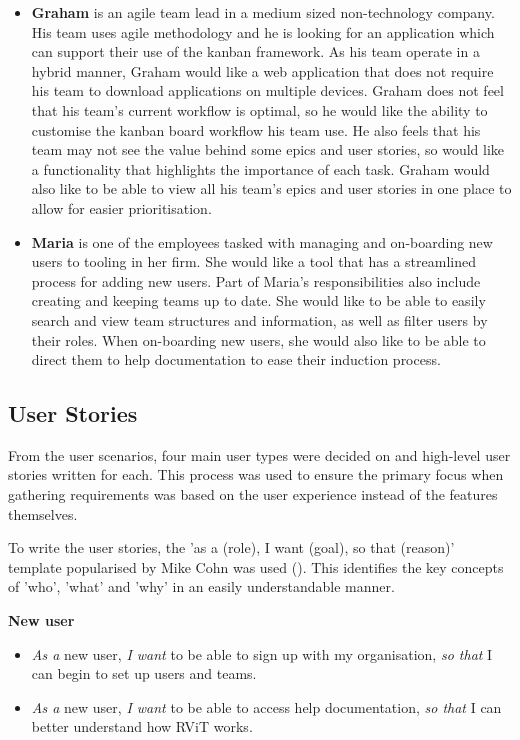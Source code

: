 \documentclass[l4proj.tex]{subfiles}
\begin{document}
\begin{itemize}
    \item \textbf{Graham} is an agile team lead in a medium sized non-technology company. His team uses agile methodology and he is looking for an application which can support their use of the kanban framework. As his team operate in a hybrid manner, Graham would like a web application that does not require his team to download applications on multiple devices. Graham does not feel that his team's current workflow is optimal, so he would like the ability to customise the kanban board workflow his team use. He also feels that his team may not see the value behind some epics and user stories, so would like a functionality that highlights the importance of each task. Graham would also like to be able to view all his team's epics and user stories in one place to allow for easier prioritisation. \\

    \item \textbf{Maria} is one of the employees tasked with managing and on-boarding new users to tooling in her firm. She would like a tool that has a streamlined process for adding new users. Part of Maria's responsibilities also include creating and keeping teams up to date. She would like to be able to easily search and view team structures and information, as well as filter users by their roles. When on-boarding new users, she would also like to be able to direct them to help documentation to ease their induction process. 
\end{itemize}

\subsection{User Stories}
From the user scenarios, four main user types were decided on and high-level user stories written for each. This process was used to ensure the primary focus when gathering requirements was based on the user experience instead of the features themselves. 

To write the user stories, the 'as a (role), I want (goal), so that (reason)' template popularised by Mike Cohn was used (\cite{Cohn}). This identifies the key concepts of 'who', 'what' and 'why' in an easily understandable manner. 


\textbf{New user}
\begin{itemize}
    \item \textit{As a} new user, \textit{I want} to be able to sign up with my organisation, \textit{so that} I can begin to set up users and teams.
    \item \textit{As a} new user, \textit{I want} to be able to access help documentation, \textit{so that} I can better understand how RViT works.
\end{itemize}
\end{document}
